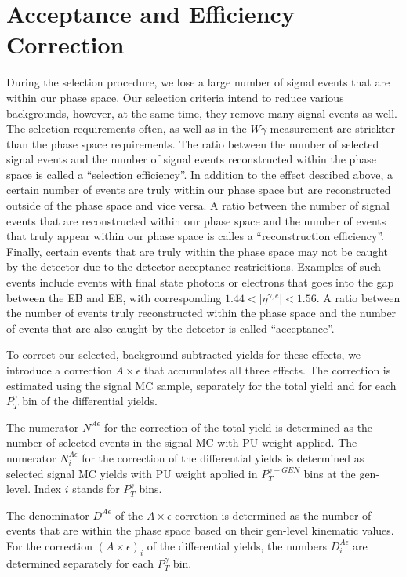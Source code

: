 \section{Acceptance and Efficiency Correction}
\label{sec:AccXEff}

During the selection procedure, we lose a large number of signal events that are within our phase space. Our selection criteria intend to reduce various backgrounds, however, at the same time, they remove many signal events as well. The selection requirements often, as well as in the $W\gamma$ measurement are strickter than the phase space requirements. The ratio between the number of selected signal events and the number of signal events reconstructed within the phase space is called a ``selection efficiency''. In addition to the effect descibed above, a certain number of events are truly within our phase space but are reconstructed outside of the phase space and vice versa. A ratio between the number of signal events that are reconstructed within our phase space and the number of events that truly appear within our phase space is calles a ``reconstruction efficiency''. Finally, certain events that are truly within the phase space may not be caught by the detector due to the detector acceptance restricitions. Examples of such events include events with final state photons or electrons that goes into the gap between the EB and EE, with corresponding $1.44<|\eta^{\gamma,e}|<1.56$. A ratio between the number of events truly reconstructed within the phase space and the number of events that are also caught by the detector is called ``acceptance''.  

To correct our selected, background-subtracted yields for these effects, we introduce a correction $A \times \epsilon$ that accumulates all three effects. The correction is estimated using the signal MC sample, separately for the total yield and for each $P_T^{\gamma}$ bin of the differential yields. 

The numerator $N^{A\epsilon}$ for the correction of the total yield is determined as the number of selected events in the signal MC with PU weight applied. The numerator $N^{A\epsilon}_i$ for the correction of the differential yields is determined as selected signal MC yields with PU weight applied in $P_T^{\gamma-GEN}$ bins at the gen-level. Index $i$ stands for $P_T^{\gamma}$ bins.

The denominator $D^{A\epsilon}$ of the $A \times \epsilon$ corretion is determined as the number of events that are within the phase space based on their gen-level kinematic values. For the correction $(A \times \epsilon)_i$ of the differential yields, the numbers $D^{A\epsilon}_{i}$ are determined separately for each $P_T^\gamma$ bin.  

